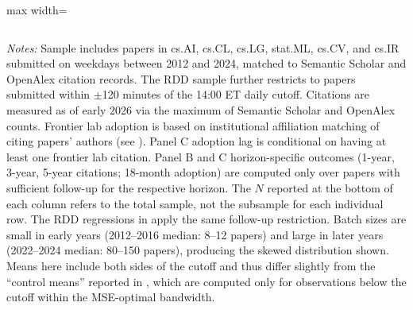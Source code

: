 \begin{table}[htbp]
\begin{adjustbox}{max width=\textwidth}
\begin{tabular}{lcccccc}
\hline\hline
\end{tabular}
\end{adjustbox}
\begin{minipage}{0.95\textwidth}
\footnotesize
\textit{Notes:} Sample includes papers in cs.AI, cs.CL, cs.LG, stat.ML, cs.CV, and cs.IR submitted on weekdays between 2012 and 2024, matched to Semantic Scholar and OpenAlex citation records. The RDD sample further restricts to papers submitted within $\pm$120 minutes of the 14:00 ET daily cutoff. Citations are measured as of early 2026 via the maximum of Semantic Scholar and OpenAlex counts. Frontier lab adoption is based on institutional affiliation matching of citing papers' authors (see ). Panel C adoption lag is conditional on having at least one frontier lab citation. Panel B and C horizon-specific outcomes (1-year, 3-year, 5-year citations; 18-month adoption) are computed only over papers with sufficient follow-up for the respective horizon. The $N$ reported at the bottom of each column refers to the total sample, not the subsample for each individual row. The RDD regressions in  apply the same follow-up restriction. Batch sizes are small in early years (2012--2016 median: 8--12 papers) and large in later years (2022--2024 median: 80--150 papers), producing the skewed distribution shown. Means here include both sides of the cutoff and thus differ slightly from the ``control means'' reported in , which are computed only for observations below the cutoff within the MSE-optimal bandwidth.
\end{minipage}
\end{table}
